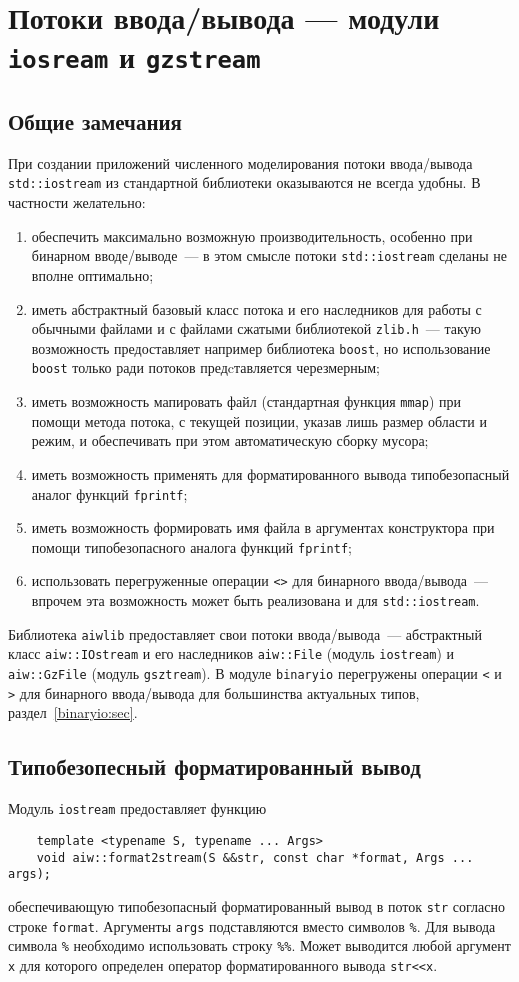 \section{Потоки ввода/вывода --- модули {\tt iosream} и {\tt gzstream}}
\subsection{Общие замечания}
При создании приложений численного моделирования потоки ввода/вывода \verb'std::iostream'
из стандартной библиотеки оказываются не всегда удобны. В частности желательно:
\begin{enumerate}
\item обеспечить максимально возможную производительность, особенно при бинарном вводе/выводе~---
  в этом смысле потоки \verb'std::iostream' сделаны не вполне оптимально;
\item иметь абстрактный базовый класс потока и его наследников для работы с обычными файлами и с файлами сжатыми
  библиотекой \verb'zlib.h'~--- такую возможность предоставляет например библиотека
  \verb'boost', но использование \verb'boost' только ради потоков предcтавляется черезмерным;
\item иметь возможность мапировать файл (стандартная функция \verb'mmap') при помощи метода потока,
  с текущей позиции, указав лишь размер области и режим, и обеспечивать при этом автоматическую сборку мусора;
\item иметь возможность применять для форматированного вывода типобезопасный аналог функций \verb'fprintf';
\item иметь возможность формировать имя файла в аргументах конструктора при помощи типобезопасного аналога функций \verb'fprintf';
\item использовать перегруженные операции {\tt <>} для бинарного
  ввода/вывода~--- 
впрочем эта возможность может быть реализована и для
\verb'std::iostream'.
\end{enumerate}
Библиотека \verb'aiwlib' предоставляет свои потоки ввода/вывода~--- абстрактный класс \verb'aiw::IOstream'
и его наследников \verb'aiw::File' (модуль \verb'iostream') и \verb'aiw::GzFile' (модуль \verb'gsztream'). В модуле \verb'binaryio'
перегружены операции \verb'<' и \verb'>' для бинарного ввода/вывода
для большинства актуальных типов, раздел~\ref{binaryio:sec}.

\subsection{Типобезопесный форматированный вывод}
Модуль \verb'iostream' предоставляет функцию
\begin{verbatim}
    template <typename S, typename ... Args>
    void aiw::format2stream(S &&str, const char *format, Args ... args);
\end{verbatim}
обеспечивающую типобезопасный форматированный вывод в поток \verb'str' согласно строке \verb'format'.
Аргументы \verb'args' подставляются вместо символов \verb'%'.
Для вывода символа \verb'%' необходимо использовать строку \verb'%%'.
Может выводится любой аргумент \verb'x' для которого определен оператор
форматированного вывода \verb'str<<x'.

